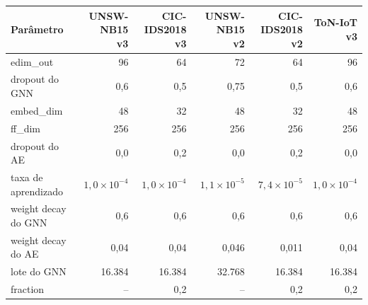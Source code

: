 \begin{tabular}{lrrrrr}
\toprule
Parâmetro & \makecell{UNSW-NB15\\v3} & \makecell{CIC-IDS2018\\v3} & \makecell{UNSW-NB15\\v2} & \makecell{CIC-IDS2018\\v2} & \makecell{ToN-IoT\\v3} \\
\midrule
edim\_out & 96 & 64 & 72 & 64 & 96 \\
dropout do GNN & 0{,}6 & 0{,}5 & 0{,}75 & 0{,}5 & 0{,}6 \\
embed\_dim & 48 & 32 & 48 & 32 & 48 \\
ff\_dim & 256 & 256 & 256 & 256 & 256 \\
dropout do AE & 0{,}0 & 0{,}2 & 0{,}0 & 0{,}2 & 0{,}0 \\
taxa de aprendizado & $1{,}0 \times 10^{-4}$ & $1{,}0 \times 10^{-4}$ & $1{,}1 \times 10^{-5}$ & $7{,}4 \times 10^{-5}$ & $1{,}0 \times 10^{-4}$ \\
weight decay do GNN & 0{,}6 & 0{,}6 & 0{,}6 & 0{,}6 & 0{,}6 \\
weight decay do AE & 0{,}04 & 0{,}04 & 0{,}046 & 0{,}011 & 0{,}04 \\
lote do GNN & 16.384 & 16.384 & 32.768 & 16.384 & 16.384 \\
fraction & -- & 0{,}2 & -- & 0{,}2 & 0{,}2 \\
\bottomrule
\end{tabular}
